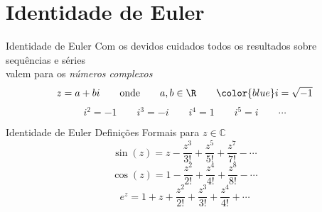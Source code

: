\section{Identidade de Euler}

\begin{frame}{Identidade de Euler}
  Com os devidos cuidados todos os resultados sobre sequências e séries\\
  valem para os \emph{números complexos}
  \vspace{\baselineskip}
  \[
    z = a + bi \qquad \text{onde} \qquad a, b \in \R \qquad {\color{blue}i=\sqrt{-1}}
  \]
  \pause
  \vspace{0.5\baselineskip}
  \[
    i^2 = -1 \qquad i^3 = -i \qquad i^4 = 1 \qquad i^5 = i \qquad \cdots
  \]
\end{frame}

\begin{frame}{Identidade de Euler}
Definições Formais para $z\in\mathbb{C}$
\pause
\[
  \sin(z) = z - \frac{z^3}{3!} + \frac{z^5}{5!} + \frac{z^7}{7!} - \cdots
\]
\pause
\[
  \cos(z) = 1 - \frac{z^2}{2!} + \frac{z^4}{4!} + \frac{z^8}{8!} - \cdots
\]
\pause
\[
  e^z = 1 + z + \frac{z^2}{2!} + \frac{z^3}{3!} + \frac{z^4}{4!} +  \cdots
\]
\end{frame}

